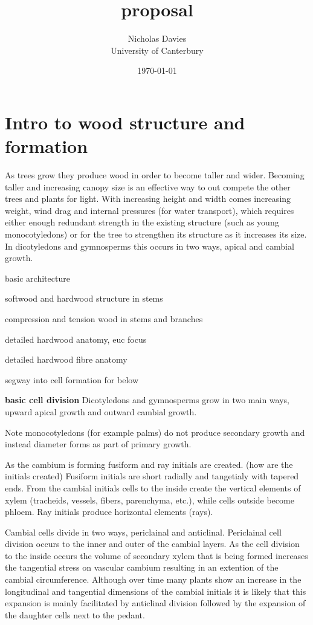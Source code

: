 \documentclass{article}
\begin{document}
\title{proposal}

\author{Nicholas Davies\\ University of Canterbury }

\date{\today}



\maketitle

\section{Intro to wood structure and formation}
As trees grow they produce wood in order to become taller and wider. Becoming
taller and increasing canopy size is an effective way to out compete the other
trees and plants for light. With increasing height and width comes increasing
weight, wind drag and internal pressures (for water transport), which requires
either enough redundant strength in the existing structure (such as young monocotyledons) or
for the tree to strengthen its structure as it increases its size. In
dicotyledons and gymnosperms this occurs in two ways, apical and cambial growth.

basic architecture

softwood and hardwood structure in stems

compression and tension wood in stems and branches

detailed hardwood anatomy, euc focus

detailed hardwood fibre anatomy

segway into cell formation for below

\textbf{basic cell division}
Dicotyledons and gymnosperms grow in two main ways, upward apical growth and
outward cambial growth.

Note monocotyledons (for example palms) do not produce secondary growth and instead diameter
forms as part of primary growth.

As the cambium is forming fusiform and ray initials are created.
(how are the initials created)
Fusiform initials are short radially and tangetialy with tapered
ends. From the cambial initials cells to the inside create the vertical elements
of xylem (tracheids, vessels, fibers, parenchyma, etc.), while cells outside become phloem.
Ray initials produce horizontal elements (rays).

Cambial cells divide in two ways, periclainal and anticlinal.
Periclainal cell division occurs to the inner and outer of the cambial layers.
As the cell division to the inside occurs the volume of secondary xylem that is being
formed increases the tangential stress on vascular cambium resulting in an
extention of the cambial circumference. Although over time many plants show an
increase in the longitudinal and tangential dimensions of the cambial initials it is
likely that this expansion is mainly facilitated by anticlinal division followed
by the expansion of the daughter cells next to the pedant.
\end{document}
